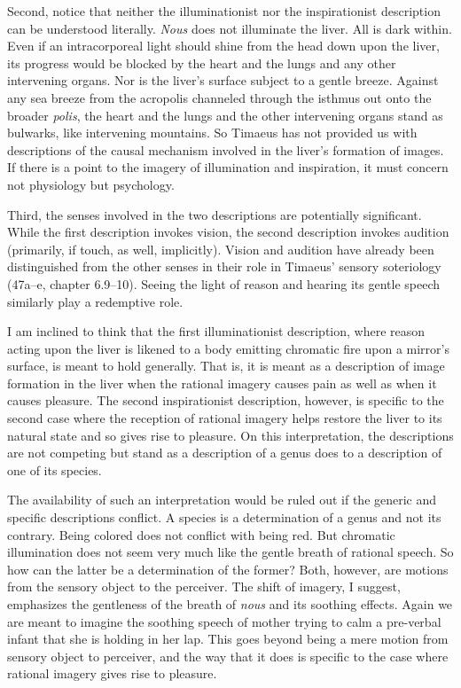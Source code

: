 Second, notice that neither the illuminationist nor the inspirationist description can be understood literally. \emph{Nous} does not illuminate the liver. All is dark within. Even if an intracorporeal light should shine from the head down upon the liver, its progress would be blocked by the heart and the lungs and any other intervening organs. Nor is the liver's surface subject to a gentle breeze. Against any sea breeze from the acropolis channeled through the isthmus out onto the broader \emph{polis}, the heart and the lungs and the other intervening organs stand as bulwarks, like intervening mountains. So Timaeus has not provided us with descriptions of the causal mechanism involved in the liver's formation of images. If there is a point to the imagery of illumination and inspiration, it must concern not physiology but psychology. 

Third, the senses involved in the two descriptions are potentially significant. While the first description invokes vision, the second description invokes audition (primarily, if touch, as well, implicitly). Vision and audition have already been distinguished from the other senses in their role in Timaeus' sensory soteriology (47a--e, chapter 6.9--10). Seeing the light of reason and hearing its gentle speech similarly play a redemptive role.

I am inclined to think that the first illuminationist description, where reason acting upon the liver is likened to a body emitting chromatic fire upon a mirror's surface, is meant to hold generally. That is, it is meant as a description of image formation in the liver when the rational imagery causes pain as well as when it causes pleasure. The second inspirationist description, however, is specific to the second case where the reception of rational imagery helps restore the liver to its natural state and so gives rise to pleasure. On this interpretation, the descriptions are not competing but stand as a description of a genus does to a description of one of its species.

The availability of such an interpretation would be ruled out if the generic and specific descriptions conflict. A species is a determination of a genus and not its contrary. Being colored does not conflict with being red. But chromatic illumination does not seem very much like the gentle breath of rational speech. So how can the latter be a determination of the former? Both, however, are motions from the sensory object to the perceiver. The shift of imagery, I suggest, emphasizes the gentleness of the breath of \emph{nous} and its soothing effects. Again we are meant to imagine the soothing speech of mother trying to calm a pre-verbal infant that she is holding in her lap. This goes beyond being a mere motion from sensory object to perceiver, and the way that it does is specific to the case where rational imagery gives rise to pleasure.

